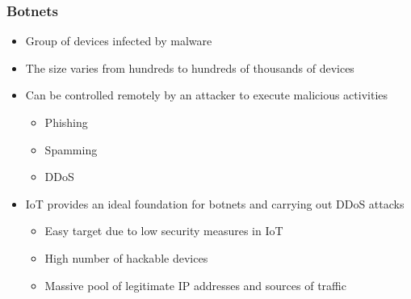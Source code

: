 \documentclass[10pt, presentation]{beamer}
\begin{document}
    \begin{frame}
        \frametitle{Botnets}
        \begin{itemize}
            \item Group of devices infected by malware
            \item The size varies from hundreds to hundreds of thousands of devices \cite{article:8}
            \item Can be controlled remotely by an attacker to execute malicious activities
            \begin{itemize}
                \item Phishing
                \item Spamming
                \item DDoS
            \end{itemize}
            \item IoT provides an ideal foundation for botnets and carrying out DDoS attacks
            \begin{itemize}
                \item Easy target due to low security measures in IoT
                \item High number of hackable devices
                \item Massive pool of legitimate IP addresses and sources of traffic
            \end{itemize}
        \end{itemize}
    \end{frame}
\end{document}
